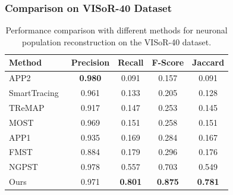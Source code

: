 \subsubsection{Comparison on VISoR-40 Dataset}

\begin{table}[th]
	\centering
	\caption{Performance comparison with different methods for neuronal population reconstruction on the VISoR-40 dataset.}
	\label{table:compare_VISoR}
	\begin{tabular}{lcccc}
		\toprule
		Method & Precision & Recall & F-Score & Jaccard\\
		\midrule
		APP2~\cite{Xiao2013}
		& \textbf{0.980} & 0.091 & 0.157 & 0.091\\
		SmartTracing~\cite{Chen2015}
		& 0.961 & 0.133 & 0.205 & 0.128\\
		TReMAP~\cite{Zhou2016}
		& 0.917 & 0.147 & 0.253 & 0.145\\
		MOST~\cite{Wu2014}          
		& 0.969 & 0.151& 0.258& 0.151\\
		APP1~\cite{Peng2011}
		& 0.935 & 0.169 & 0.284 & 0.167\\
		FMST~\cite{Yang2018}
		& 0.884 & 0.179 & 0.296 &  0.176\\
		NGPST~\cite{Quan2015}
		& 0.978 & 0.557& 0.703 & 0.549\\
		\midrule
		Ours
		& 0.971 & \textbf{0.801}&\textbf{0.875} & \textbf{0.781}\\
		\bottomrule
	\end{tabular}
\end{table}

